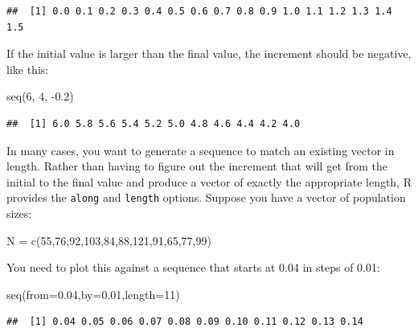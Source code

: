 \documentclass[
]{book}
\newenvironment{Shaded}{\begin{snugshade}}{\end{snugshade}}
\newcommand{\AttributeTok}[1]{\textcolor[rgb]{0.77,0.63,0.00}{#1}}
\newcommand{\DecValTok}[1]{\textcolor[rgb]{0.00,0.00,0.81}{#1}}
\newcommand{\FloatTok}[1]{\textcolor[rgb]{0.00,0.00,0.81}{#1}}
\newcommand{\FunctionTok}[1]{\textcolor[rgb]{0.00,0.00,0.00}{#1}}
\newcommand{\NormalTok}[1]{#1}
\newcommand{\OtherTok}[1]{\textcolor[rgb]{0.56,0.35,0.01}{#1}}
\newcommand{\SpecialCharTok}[1]{\textcolor[rgb]{0.00,0.00,0.00}{#1}}
\theoremstyle{definition}
\theoremstyle{definition}
\theoremstyle{definition}
\theoremstyle{definition}
\theoremstyle{remark}
\begin{document}
\begin{verbatim}
##  [1] 0.0 0.1 0.2 0.3 0.4 0.5 0.6 0.7 0.8 0.9 1.0 1.1 1.2 1.3 1.4 1.5
\end{verbatim}

If the initial value is larger than the final value, the increment should be negative, like this:

\begin{Shaded}
\begin{Highlighting}[]
\FunctionTok{seq}\NormalTok{(}\DecValTok{6}\NormalTok{, }\DecValTok{4}\NormalTok{, }\SpecialCharTok{{-}}\FloatTok{0.2}\NormalTok{)}
\end{Highlighting}
\end{Shaded}

\begin{verbatim}
##  [1] 6.0 5.8 5.6 5.4 5.2 5.0 4.8 4.6 4.4 4.2 4.0
\end{verbatim}

In many cases, you want to generate a sequence to match an existing vector in length. Rather than having to figure out the increment that will get from the initial to the final value and produce a vector of exactly the appropriate length, R provides the \texttt{along} and \texttt{length} options. Suppose you have a vector of population sizes:

\begin{Shaded}
\begin{Highlighting}[]
\NormalTok{N }\OtherTok{=} \FunctionTok{c}\NormalTok{(}\DecValTok{55}\NormalTok{,}\DecValTok{76}\NormalTok{,}\DecValTok{92}\NormalTok{,}\DecValTok{103}\NormalTok{,}\DecValTok{84}\NormalTok{,}\DecValTok{88}\NormalTok{,}\DecValTok{121}\NormalTok{,}\DecValTok{91}\NormalTok{,}\DecValTok{65}\NormalTok{,}\DecValTok{77}\NormalTok{,}\DecValTok{99}\NormalTok{)}
\end{Highlighting}
\end{Shaded}

You need to plot this against a sequence that starts at 0.04 in steps of 0.01:

\begin{Shaded}
\begin{Highlighting}[]
\FunctionTok{seq}\NormalTok{(}\AttributeTok{from=}\FloatTok{0.04}\NormalTok{,}\AttributeTok{by=}\FloatTok{0.01}\NormalTok{,}\AttributeTok{length=}\DecValTok{11}\NormalTok{)}
\end{Highlighting}
\end{Shaded}

\begin{verbatim}
##  [1] 0.04 0.05 0.06 0.07 0.08 0.09 0.10 0.11 0.12 0.13 0.14
\end{verbatim}
\end{document}
